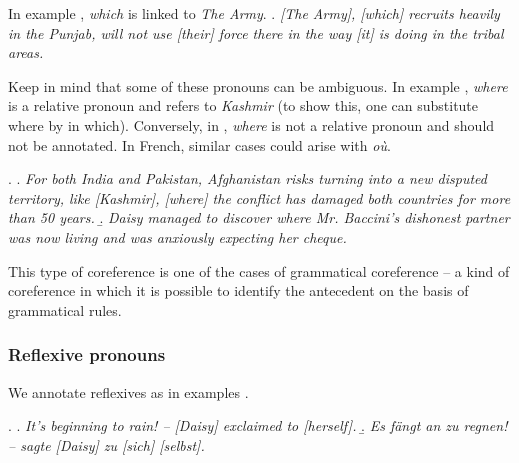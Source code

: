 \documentclass[a4paper]{article}
\begin{document}
In example \Next, {\sl which} is linked to \textsl{\sl The Army}.
\ex.
\textsl{[The Army], [which] recruits heavily in the Punjab, will not use [their] force there in the way [it] is doing in the tribal areas.}

Keep in mind that some of these pronouns can be ambiguous. In example \Next[a],
{\sl where} is a relative pronoun and refers to {\sl Kashmir} (to show this, one
can substitute where by in which). Conversely, in \Next[b], {\sl where} is not a
relative pronoun and should not be annotated. In French, similar cases could
arise with \textsl{où}.

\ex.
\a. {\sl For both India and Pakistan, Afghanistan risks turning into a new disputed
territory, like [Kashmir], [where] the conflict has damaged both countries for more than 50 years.}
\b. {\sl Daisy managed to discover where Mr. Baccini’s dishonest partner was now living and was anxiously expecting her cheque.}

This type of coreference is one of the cases of grammatical coreference --  a
kind of coreference in which it is possible to identify the antecedent on the
basis of grammatical rules.

\subsubsection{Reflexive pronouns}
We annotate reflexives as in examples \Next.

\ex.
\a. {\sl It's beginning to rain! -- [Daisy] exclaimed to [herself].}
\b.  {\sl Es fängt an zu regnen! -- sagte [Daisy] zu [sich] [selbst].}

% 
\end{document}
